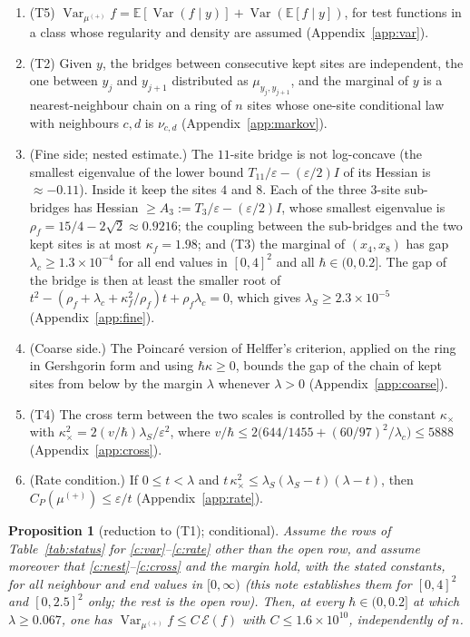 \documentclass[11pt,a4paper]{article}
\newtheorem{proposition}[theorem]{Proposition}
\theoremstyle{definition}
\theoremstyle{remark}
\newcommand{\hk}{\hbar\kappa}
\newcommand{\E}{\mathbb{E}}
\DeclareMathOperator{\Var}{Var}
\begin{document}
\begin{enumerate}[label=(C\arabic*),leftmargin=2.6em]
\item\label{c:var} (T5) $\Var_{\mu^{(+)}}f=\E[\Var(f\mid y)]+\Var(\E[f\mid y])$, for test functions in a class whose regularity and density are assumed (Appendix~\ref{app:var}).
\item\label{c:markov} (T2) Given $y$, the bridges between consecutive kept sites are independent, the one between $y_j$ and $y_{j+1}$ distributed as $\mu_{y_j,y_{j+1}}$, and the marginal of $y$ is a nearest-neighbour chain on a ring of $n$ sites whose one-site conditional law with neighbours $c,d$ is $\nu_{c,d}$ (Appendix~\ref{app:markov}).
\item\label{c:nest} (Fine side; nested estimate.) The $11$-site bridge is not log-concave (the smallest eigenvalue of the lower bound $T_{11}/\varepsilon-(\varepsilon/2)I$ of its Hessian is $\approx-0.11$). Inside it keep the sites $4$ and $8$. Each of the three $3$-site sub-bridges has Hessian $\ge A_3:=T_3/\varepsilon-(\varepsilon/2)I$, whose smallest eigenvalue is $\rho_f=15/4-2\sqrt2\approx0.9216$; the coupling between the sub-bridges and the two kept sites is at most $\kappa_f=1.98$; and (T3) the marginal of $(x_4,x_8)$ has gap $\lambda_c\ge1.3\times10^{-4}$ for all end values in $[0,4]^2$ and all $\hbar\in(0,0.2]$. The gap of the bridge is then at least the smaller root of $t^2-(\rho_f+\lambda_c+\kappa_f^2/\rho_f)t+\rho_f\lambda_c=0$, which gives $\lambda_S\ge2.3\times10^{-5}$ (Appendix~\ref{app:fine}).
\item\label{c:coarse} (Coarse side.) The Poincaré version of Helffer's criterion, applied on the ring in Gershgorin form and using $\hk\ge0$, bounds the gap of the chain of kept sites from below by the margin $\lambda$ whenever $\lambda>0$ (Appendix~\ref{app:coarse}).
\item\label{c:cross} (T4) The cross term between the two scales is controlled by the constant $\kappa_\times$ with $\kappa_\times^2=2(v/\hbar)\lambda_S/\varepsilon^2$, where $v/\hbar\le2\bigl(644/1455+(60/97)^2/\lambda_c\bigr)\le5888$ (Appendix~\ref{app:cross}).
\item\label{c:rate} (Rate condition.) If $0\le t<\lambda$ and $t\,\kappa_\times^2\le\lambda_S(\lambda_S-t)(\lambda-t)$, then $C_P(\mu^{(+)})\le\varepsilon/t$ (Appendix~\ref{app:rate}).
\end{enumerate}

\begin{proposition}[reduction to (T1); conditional]\label{prop:reduction}
Assume the rows of Table~\ref{tab:status} for \ref{c:var}--\ref{c:rate} other than the open row, and assume moreover that \ref{c:nest}--\ref{c:cross} and the margin hold, with the stated constants, for all neighbour and end values in $[0,\infty)$ \textup{(}this note establishes them for $[0,4]^2$ and $[0,2.5]^2$ only; the rest is the open row\textup{)}. Then, at every $\hbar\in(0,0.2]$ at which $\lambda\ge0.067$, one has $\Var_{\mu^{(+)}}f\le C\,\mathcal E(f)$ with $C\le1.6\times10^{10}$, independently of $n$.
\end{proposition}
\end{document}
